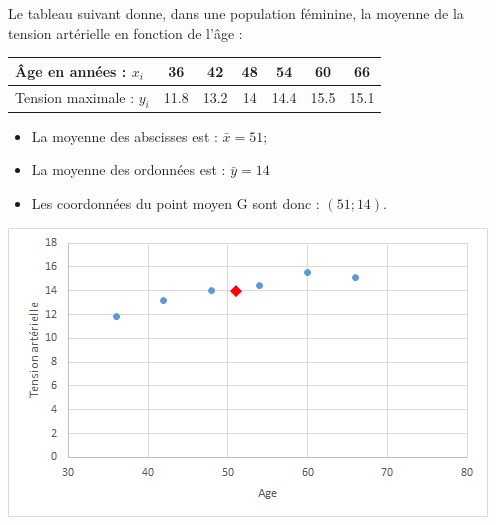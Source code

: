 \begin{myex}
 Le tableau suivant donne, dans une population féminine, la moyenne de la tension artérielle en fonction de l'âge :\\
	
		
	\vspace*{-0.5cm}

	\begin{center}
			{\footnotesize  \begin{tabular}{|@{\ }l@{\ }|@{\ }c@{\ }|@{\ }c@{\ }|@{\ }c@{\ }|@{\ }c@{\ }|@{\ }c@{\ }|@{\ }c@{\ }|}
					\hline
					\^Age en années : $x_i$  & 36         & 42         & 48 & 54         & 60         & 66         \\ \hline
					Tension maximale : $y_i$ & \num{11.8} & \num{13.2} & 14 & \num{14.4} & \num{15.5} & \num{15.1} \\ \hline
				\end{tabular}}
	\end{center}
	


	\begin{itemize}
		\item La moyenne des abscisses est : $\bar{x} = 51$;
		\item La moyenne des ordonnées est : $\bar{y} = 14$
		\item Les coordonnées du point moyen G sont donc : $(51 ; 14)$.\\
	\end{itemize}
	
	\vspace*{-0.7cm}
			
	\begin{center}
		\includegraphics[scale=0.7]{./img/ex1}
	\end{center}


\end{myex}